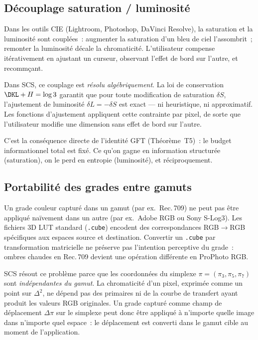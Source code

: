 \documentclass[12pt,a4paper]{article}
\begin{document}
\subsection{D\'ecouplage saturation / luminosit\'e}

Dans les outils CIE (Lightroom, Photoshop, DaVinci Resolve), la
saturation et la luminosit\'e sont coupl\'ees~: augmenter la saturation
d'un bleu de ciel l'assombrit~; remonter la luminosit\'e d\'ecale la
chromaticit\'e. L'utilisateur compense it\'erativement en ajustant un
curseur, observant l'effet de bord sur l'autre, et recomm\c{c}ant.

Dans SCS, ce couplage est \emph{r\'esolu alg\'ebriquement}. La loi
de conservation $\DKL + H = \log 3$ garantit que pour toute modification
de saturation $\delta S$, l'ajustement de luminosit\'e
$\delta L = -\delta S$ est exact --- ni heuristique, ni approximatif.
Les fonctions d'ajustement appliquent cette contrainte par pixel, de
sorte que l'utilisateur modifie une dimension sans effet de bord sur
l'autre.

C'est la cons\'equence directe de l'identit\'e GFT (Th\'eor\`eme~T5)~:
le budget informationnel total est fix\'e. Ce qu'on gagne en
information structur\'ee (saturation), on le perd en entropie
(luminosit\'e), et r\'eciproquement.

\subsection{Portabilit\'e des grades entre gamuts}

Un grade couleur captur\'e dans un gamut (par ex.\ Rec.\,709) ne peut
pas \^etre appliqu\'e na\"ivement dans un autre (par ex.\ Adobe RGB ou
Sony S-Log3). Les fichiers 3D LUT standard (\texttt{.cube}) encodent
des correspondances RGB$\to$RGB sp\'ecifiques aux espaces source et
destination. Convertir un \texttt{.cube} par transformation matricielle
ne pr\'eserve pas l'intention perceptive du grade~: \og ombres
chaudes \fg{} en Rec.\,709 devient une op\'eration diff\'erente en
ProPhoto RGB.

SCS r\'esout ce probl\`eme parce que les coordonn\'ees du simplexe
$\pi = (\pi_3, \pi_5, \pi_7)$ sont \emph{ind\'ependantes du gamut}.
La chromaticit\'e d'un pixel, exprim\'ee comme un point sur $\Delta^2$,
ne d\'epend pas des primaires ni de la courbe de transfert ayant
produit les valeurs RGB originales. Un grade captur\'e comme champ de
d\'eplacement $\Delta\pi$ sur le simplexe peut donc \^etre appliqu\'e
\`a n'importe quelle image dans n'importe quel espace~: le
d\'eplacement est converti dans le gamut cible au moment de
l'application.
\end{document}
